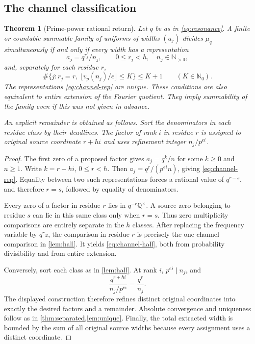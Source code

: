 \documentclass[11pt,letterpaper]{article}
\newtheorem{theorem}{Theorem}[section]
\theoremstyle{definition}
\theoremstyle{remark}
\newcommand{\N}{\mathbb N_0}
\newcommand{\Np}{\mathbb N_{>0}}
\newcommand{\Q}{\mathbb Q}
\numberwithin{equation}{section}
\begin{document}
\subsection{The channel classification}
\begin{theorem}[Prime-power rational return]\label{thm:channels}
Let $q$ be as in \eqref{eq:resonance}. A finite or countable summable family of uniforms of widths $(a_j)$ divides $\mu_q$ simultaneously if and only if every width has a representation
\begin{equation}\label{eq:channel-rep}
 a_j=q^{r_j}/n_j,\qquad 0\le r_j<h,\quad n_j\in\Np,
\end{equation}
and, separately for each residue $r$,
\begin{equation}\label{eq:channel-hall}
 \#\{j:r_j=r,\ \lfloor v_p(n_j)/e\rfloor\le K\}
 \le K+1\qquad(K\in\N).
\end{equation}
The representations \eqref{eq:channel-rep} are unique. These conditions are also equivalent to entire extension of the Fourier quotient. They imply summability of the family even if this was not given in advance.

An explicit remainder is obtained as follows. Sort the denominators in each residue class by their deadlines. The factor of rank $i$ in residue $r$ is assigned to original source coordinate $r+hi$ and uses refinement integer $n_j/p^{ei}$.
\end{theorem}
\begin{proof}
The first zero of a proposed factor gives $a_j=q^k/n$ for some $k\ge0$ and $n\ge1$. Write $k=r+hi$, $0\le r<h$. Then $a_j=q^r/(p^{ei}n)$, giving \eqref{eq:channel-rep}. Equality between two such representations forces a rational value of $q^{r-s}$, and therefore $r=s$, followed by equality of denominators.

Every zero of a factor in residue $r$ lies in $q^{-r}\Q^\times$. A source zero belonging to residue $s$ can lie in this same class only when $r=s$. Thus zero multiplicity comparisons are entirely separate in the $h$ classes. After replacing the frequency variable by $q^rz$, the comparison in residue $r$ is precisely the one-channel comparison in \cref{lem:hall}. It yields \eqref{eq:channel-hall}, both from probability divisibility and from entire extension.

Conversely, sort each class as in \cref{lem:hall}. At rank $i$, $p^{ei}\mid n_j$, and
\[
 \frac{q^{r+hi}}{n_j/p^{ei}}=\frac{q^r}{n_j}.
\]
The displayed construction therefore refines distinct original coordinates into exactly the desired factors and a remainder. Absolute convergence and uniqueness follow as in \cref{thm:separated,lem:unique}. Finally, the total extracted width is bounded by the sum of all original source widths because every assignment uses a distinct coordinate.
\end{proof}
\end{document}
